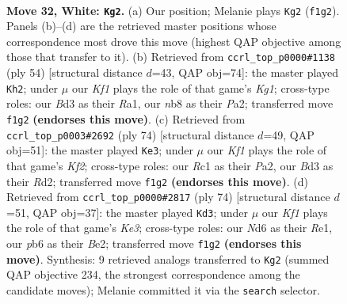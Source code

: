 \documentclass[11pt]{article}
\begin{document}
\clearpage

\begin{figure}[p]\centering
\begin{subfigure}{0.46\textwidth}\centering
\resizebox{\linewidth}{!}{%
\newchessgame
\chessboard[
  setfen={1nb5/6k1/1p1Np3/4r1p1/5p2/3B1P2/2P5/2RN1K1r w - - 2 32},
  showmover=false,
  pgfstyle=straightmove, color=movearrow, markmove={f1-g2}
]}
\caption{}
\end{subfigure}\hfill
\begin{subfigure}{0.46\textwidth}\centering
\resizebox{\linewidth}{!}{%
\newchessgame
\chessboard[
  setfen={2b3k1/8/4p3/1pp1pr2/4N3/3P2P1/PP2n1B1/R5K1 w - - 3 28},
  showmover=false,
  pgfstyle=straightmove, color=movearrow, markmove={g1-h2}
]}
\caption{}
\end{subfigure}
\\[4pt]
\begin{subfigure}{0.46\textwidth}\centering
\resizebox{\linewidth}{!}{%
\newchessgame
\chessboard[
  setfen={6k1/1b3p2/p5p1/5r2/2P5/2Np2P1/PP1R1K2/8 w - - 1 38},
  showmover=false,
  pgfstyle=straightmove, color=movearrow, markmove={f2-e3}
]}
\caption{}
\end{subfigure}\hfill
\begin{subfigure}{0.46\textwidth}\centering
\resizebox{\linewidth}{!}{%
\newchessgame
\chessboard[
  setfen={8/4Npkp/p3p3/P7/4r3/B3K3/1Pr1B1bP/4R3 w - - 2 38},
  showmover=false,
  pgfstyle=straightmove, color=movearrow, markmove={e3-d3}
]}
\caption{}
\end{subfigure}
\caption{\textbf{Move 32, White: \texttt{Kg2}.} (a) Our position; Melanie plays \texttt{Kg2} (\texttt{f1g2}). Panels (b)--(d) are the retrieved master positions whose correspondence most drove this move (highest QAP objective among those that transfer to it). (b) Retrieved from \texttt{ccrl\_top\_p0000\#1138} (ply 54) [structural distance $d$=43, QAP obj=74]: the master played \texttt{Kh2}; under $\mu$ our \emph{Kf1} plays the role of that game's \emph{Kg1}; cross-type roles: our \emph{B}d3 as their \emph{R}a1, our \emph{n}b8 as their \emph{P}a2; transferred move \texttt{f1g2} \textbf{(endorses this move)}. (c) Retrieved from \texttt{ccrl\_top\_p0003\#2692} (ply 74) [structural distance $d$=49, QAP obj=51]: the master played \texttt{Ke3}; under $\mu$ our \emph{Kf1} plays the role of that game's \emph{Kf2}; cross-type roles: our \emph{R}c1 as their \emph{P}a2, our \emph{B}d3 as their \emph{R}d2; transferred move \texttt{f1g2} \textbf{(endorses this move)}. (d) Retrieved from \texttt{ccrl\_top\_p0000\#2817} (ply 74) [structural distance $d$=51, QAP obj=37]: the master played \texttt{Kd3}; under $\mu$ our \emph{Kf1} plays the role of that game's \emph{Ke3}; cross-type roles: our \emph{N}d6 as their \emph{R}e1, our \emph{p}b6 as their \emph{B}e2; transferred move \texttt{f1g2} \textbf{(endorses this move)}. Synthesis: 9 retrieved analogs transferred to \texttt{Kg2} (summed QAP objective 234, the strongest correspondence among the candidate moves); Melanie committed it via the \texttt{search} selector.}
\label{fig:thought-m62}
\end{figure}
\end{document}
